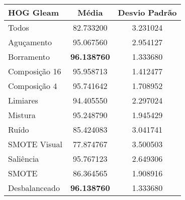 \begin{table}[!htbp]
\centering
\caption{}
\label{tab:resultados:x:melhor}
\begin{tabular}{|l|c|c|}
\hline
\textbf{HOG Gleam} & \textbf{Média}     & \textbf{Desvio Padrão} \\ \hline
   Todos        &  82.733200 &  3.231024  \\ \hline
  Aguçamento    &  95.067560 &  2.954127  \\ \hline
  Borramento    &  \textbf{96.138760} &  1.333680  \\ \hline
  Composição 16 &  95.958713 &  1.412477  \\ \hline
  Composição 4  &  95.741642 &  1.708952  \\ \hline
  Limiares      &  94.405550 &  2.297024  \\ \hline
  Mistura       &  95.248790 &  1.945429  \\ \hline
  Ruído         &  85.424083 &  3.041741  \\ \hline
  SMOTE Visual  &  77.874767 &  3.500503  \\ \hline
  Saliência     &  95.767123 &  2.649306  \\ \hline
 SMOTE          &  86.364565 &  1.908916  \\ \hline
Desbalanceado   &  \textbf{96.138760} &  1.333680  \\ \hline
\end{tabular}
\end{table}




